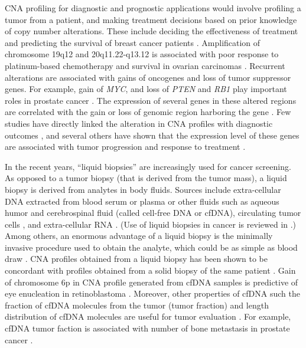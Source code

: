 CNA profiling for diagnostic and prognostic applications would involve
profiling a tumor from a patient, and making treatment decisions based
on prior knowledge of copy number alterations.
%
These include deciding the effectiveness of treatment and predicting the
survival of breast cancer patients
\citep{stuart2009linking,hicks2006novel}.
Amplification of chromosome 19q12 and 20q11.22-q13.12 is associated with
poor response to platinum-based chemotherapy and survival in ovarian
carcinomas \citep{etemadmoghadam2009integrated}.
%
Recurrent alterations are associated with gains of oncogenes and loss of
tumor suppressor genes. For example, gain of \emph{MYC}, and loss of
\emph{PTEN} and \emph{RB1} play important roles in prostate cancer
\citep{alexander2018utility}.
%
The expression of several genes in these altered regions are correlated
with the gain or loss of genomic region harboring the gene
\citep{pollack2002microarray,chitale2009integrated,lu2011integrated}.
%
Few studies have directly linked the alteration in CNA profiles with
diagnostic outcomes \citep{etemadmoghadam2009integrated,
bardelli2013amplification,berry2018genomic}, and several others have
shown that the expression level of these genes are associated with tumor
progression and response to treatment \citep{shattuck2008met,
gorre2001clinical,villanueva2013concurrent}.

In the recent years, ``liquid biopsies'' are increasingly used for cancer
screening. As opposed to a tumor biopsy (that is derived from the
tumor mass), a liquid biopsy is derived from analytes in body fluids.
Sources include extra-cellular DNA extracted from blood serum or plasma
\citep{leary2012detection,chan2013cancer,li2017cell} or other
fluids such as aqueous humor \citep{berry2017potential}
and cerebrospinal fluid \citep{mouliere2018detection} (called cell-free
DNA or cfDNA), circulating tumor cells \citep{dago2014rapid}, and
extra-cellular RNA \citep{zaporozhchenko2018potential}.  (Use of liquid
biopsies in cancer is reviewed in
\citep{heitzer2019current,crowley2013liquid, schwarzenbach2011cell}.)
%
Among others, an enormous advantage of a liquid biopsy is the minimally
invasive procedure used to obtain the analyte, which could be as simple
as blood draw \citep{heitzer2019current}.
%
CNA profiles obtained from a liquid biopsy has been shown to be
concordant with profiles obtained from a solid biopsy of the same
patient \citep{chan2013cancer,berry2017potential}.
%
Gain of chromosome 6p in CNA profile generated from cfDNA samples is
predictive of eye enucleation in retinoblastoma
\citep{berry2018genomic}.
%
Moreover, other properties of cfDNA such the fraction of cfDNA molecules
from the tumor (tumor fraction) and length distribution of cfDNA
molecules are useful for tumor evaluation \citep{choudhury2018tumor,
mouliere2018enhanced,underhill2016fragment,cristiano2019genome}.  For
example, cfDNA tumor faction is associated with number of bone
metastasis in prostate cancer \citep{choudhury2018tumor}.


